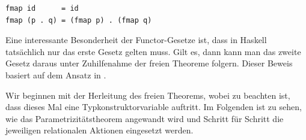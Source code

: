 
\begin{verbatim}
fmap id      = id
fmap (p . q) = (fmap p) . (fmap q)
\end{verbatim}

Eine interessante Besonderheit der Functor-Gesetze ist, dass in Haskell tatsächlich nur das erste Gesetz gelten muss. Gilt es, dann kann
man das zweite Gesetz daraus unter Zuhilfenahme der freien Theoreme folgern. Dieser Beweis basiert auf dem Ansatz in \cite{fmap}.

Wir beginnen mit der Herleitung des freien Theorems, wobei zu beachten ist, dass dieses Mal eine Typkonstruktorvariable auftritt. Im
Folgenden ist zu sehen, wie das Parametrizitätstheorem angewandt wird und Schritt für Schritt die jeweiligen relationalen Aktionen
eingesetzt werden.


